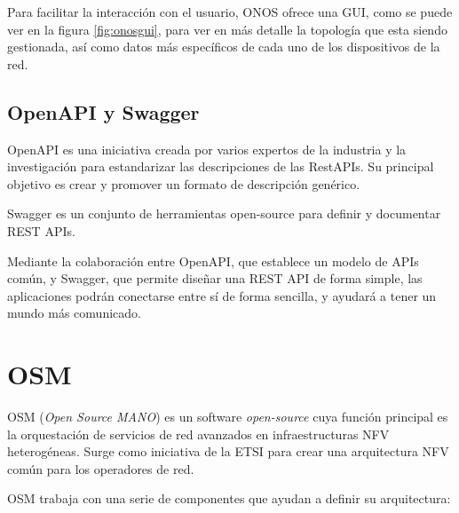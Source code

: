 Para facilitar la interacción con el usuario, ONOS ofrece una GUI, como se puede ver en la figura \ref{fig:onosgui}, para ver en más detalle la topología que esta siendo gestionada, así como datos más específicos de cada uno de los dispositivos de la red. 


\subsection{OpenAPI y Swagger}
\label{subsec:openapi}

OpenAPI\cite{openapibib} es una iniciativa creada por varios expertos de la industria y la investigación para estandarizar las descripciones de las RestAPIs. Su principal objetivo es crear y promover un formato de descripción genérico.

Swagger\cite{swaggerbib} es un conjunto de herramientas open-source para definir y documentar REST APIs.

Mediante la colaboración entre OpenAPI, que establece un modelo de APIs común, y Swagger, que permite diseñar una REST API de forma simple, las aplicaciones podrán conectarse entre sí de forma sencilla, y ayudará a tener un mundo más comunicado.

\section{OSM}
\label{sec:osm}

OSM (\textit{Open Source MANO})\cite{osmbib} es un software \textit{open-source} cuya función principal es la orquestación de servicios de red avanzados en infraestructuras NFV heterogéneas. Surge como iniciativa de la ETSI para crear una arquitectura NFV común para los operadores de red.

OSM trabaja con una serie de componentes que ayudan a definir su arquitectura:

